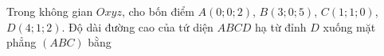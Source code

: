\begin{ex}
Trong không gian $Oxyz$, cho bốn điểm $A(0;0;2)$, $B(3;0;5)$, $C(1;1;0)$, $D(4;1;2)$. Độ dài đường cao của tứ diện $ABCD$ hạ từ đỉnh $D$ xuống mặt phẳng $(ABC)$ bằng
\end{ex}
